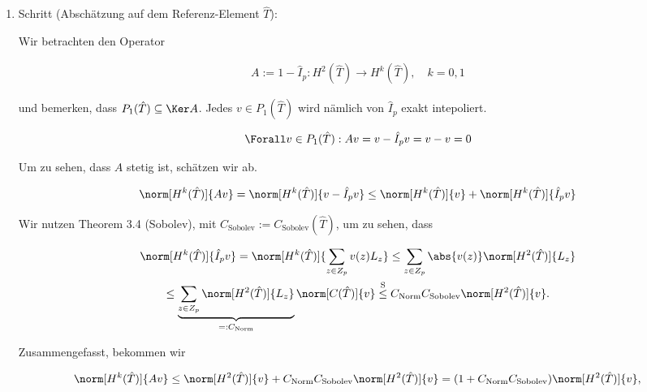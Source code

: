 \begin{solution}
\begin{enumerate}[label = \textbf{\alph*)}]
  \begin{enumerate}[label = \arabic*.]

    \item Schritt (Abschätzung auf dem Referenz-Element $\hat T$):

    Wir betrachten den Operator

    \begin{align*}
      A := 1 - \hat I_p:
      H^2(\hat T) \to H^k(\hat T),
      \quad
      k = 0, 1
    \end{align*}

    und bemerken, dass $P_1(\hat T) \subseteq \Ker A$.
    Jedes $v \in P_1(\hat T)$ wird nämlich von $\hat I_p$ exakt intepoliert.

    \begin{align*}
      \Forall v \in P_1(\hat T):
      A v = v - \hat I_p v = v - v = 0
    \end{align*}

    Um zu sehen, dass $A$ stetig ist, schätzen wir ab.

    \begin{align*}
      \norm[H^k(\hat T)]{A v}
      =
      \norm[H^k(\hat T)]{v - \hat I_p v}
      \leq
      \norm[H^k(\hat T)]{v}
      +
      \norm[H^k(\hat T)]{\hat I_p v}
    \end{align*}

    Wir nutzen Theorem 3.4 (Sobolev), mit $C_\mathrm{Sobolev} := C_\mathrm{Sobolev}(\hat T)$, um zu sehen, dass

    \begin{multline*}
      \norm[H^k(\hat T)]{\hat I_p v}
      =
      \norm[H^k(\hat T)]
      {
        \sum_{z \in Z_p}
        v(z) L_z
      }
      \leq
      \sum_{z \in Z_p}
      \abs{v(z)} \norm[H^2(\hat T)]{L_z} \\
      \leq
      \underbrace
      {
        \sum_{z \in Z_p}
        \norm[H^2(\hat T)]{L_z}
      }_{
        =: C_\mathrm{Norm}
      }
      \norm[C(\hat T)]{v}
      \stackrel
      {
        \mathrm{S}
      }{\leq}
      C_\mathrm{Norm}
      C_\mathrm{Sobolev}
      \norm[H^2(\hat T)]{v}.
    \end{multline*}

    Zusammengefasst, bekommen wir

    \begin{align*}
      \norm[H^k(\hat T)]{A v}
      \leq
      \norm[H^2(\hat T)]{v}
      +
      C_\mathrm{Norm}
      C_\mathrm{Sobolev}
      \norm[H^2(\hat T)]{v}
      =
      (1 + C_\mathrm{Norm} C_\mathrm{Sobolev})
      \norm[H^2(\hat T)]{v},
    \end{align*}


\end{enumerate}
\end{enumerate}
\end{solution}
